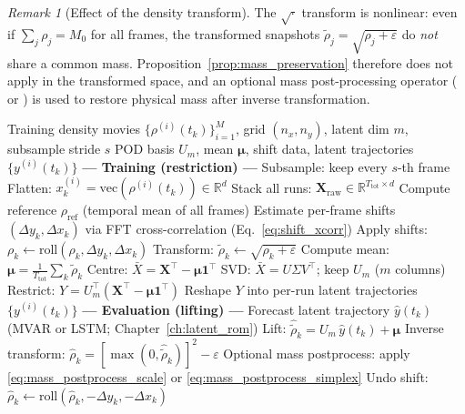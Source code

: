 \documentclass{report}
\theoremstyle{plain}
\theoremstyle{remark}
\newtheorem{remark}[theorem]{Remark}
\numberwithin{equation}{section}              %
\begin{document}
\begin{remark}[Effect of the density transform]
The $\sqrt{\cdot}$ transform is nonlinear: even if
$\sum_j\rho_j=M_0$ for all frames, the transformed snapshots
$\tilde\rho_j=\sqrt{\rho_j+\varepsilon}$ do \emph{not} share a common mass.
Proposition~\ref{prop:mass_preservation} therefore does not apply in the
transformed space, and an optional mass post-processing operator
( or ) is used to restore physical
mass after inverse transformation.
\end{remark}

%
\begin{algorithm}[H]
\caption{Global POD restriction--lifting pipeline (production).}
\label{alg:pod_pipeline}
\begin{algorithmic}[1]
\Require Training density movies $\{\rho^{(i)}(t_k)\}_{i=1}^M$, grid $(n_x,n_y)$,
  latent dim $m$, subsample stride $s$
\Ensure POD basis $U_m$, mean $\boldsymbol{\mu}$, shift data, latent trajectories
  $\{y^{(i)}(t_k)\}$
\Statex
\Statex \textbf{--- Training (restriction) ---}
  \State Subsample: keep every $s$-th frame
  \State Flatten: $x^{(i)}_k = \mathrm{vec}(\rho^{(i)}(t_k))\in\mathbb{R}^d$
\EndFor
\State Stack all runs: $\mathbf{X}_{\mathrm{raw}}\in\mathbb{R}^{T_{\mathrm{tot}}\times d}$
\State Compute reference $\rho_{\mathrm{ref}}$ (temporal mean of all frames)
\State Estimate per-frame shifts $(\Delta y_k,\Delta x_k)$ via FFT
  cross-correlation (Eq.~\ref{eq:shift_xcorr})
\State Apply shifts: $\rho_k\leftarrow\mathrm{roll}(\rho_k,\Delta y_k,\Delta x_k)$
\State Transform: $\tilde\rho_k\leftarrow\sqrt{\rho_k+\varepsilon}$
\State Compute mean: $\boldsymbol{\mu}=\tfrac{1}{T_{\mathrm{tot}}}\sum_k \tilde\rho_k$
\State Centre: $\bar{X}=\mathbf{X}^\top-\boldsymbol{\mu}\mathbf{1}^\top$
\State SVD: $\bar{X}=U\Sigma V^\top$; keep $U_m$ ($m$ columns)
\State Restrict: $Y=U_m^\top(\mathbf{X}^\top-\boldsymbol{\mu}\mathbf{1}^\top)$
\State Reshape $Y$ into per-run latent trajectories $\{y^{(i)}(t_k)\}$
\Statex
\Statex \textbf{--- Evaluation (lifting) ---}
\State Forecast latent trajectory $\hat{y}(t_k)$ (MVAR or LSTM; Chapter~\ref{ch:latent_rom})
\State Lift: $\hat{\tilde\rho}_k = U_m\,\hat{y}(t_k)+\boldsymbol{\mu}$
\State Inverse transform: $\hat\rho_k = [\max(0,\hat{\tilde\rho}_k)]^2-\varepsilon$
\State Optional mass postprocess: apply \eqref{eq:mass_postprocess_scale}
  or \eqref{eq:mass_postprocess_simplex}
\State Undo shift: $\hat\rho_k\leftarrow\mathrm{roll}(\hat\rho_k,-\Delta y_k,-\Delta x_k)$
\end{algorithmic}
\end{algorithm}
 
\end{document}
